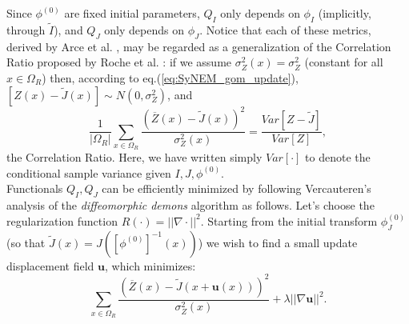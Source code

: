 Since $\phi^{(0)}$ are fixed initial parameters, $Q_{I}$ only depends on $\phi_{I}$ (implicitly, through $\tilde{I}$), and $Q_{J}$ only depends on $\phi_{J}$. Notice that each of
these metrics, derived by Arce et al. \cite{Arce-santana2014}, may be regarded as a generalization of the Correlation Ratio proposed by
Roche et al. \cite{Roche1998}: if we assume $\sigma^{2}_{Z}(x) = \sigma^{2}_{Z}$ (constant for all $x\in\Omega_{R}$) then, according to
eq.(\ref{eq:SyNEM_gom_update}),\hbox{$\left[Z(x) - \tilde{J}(x)\right] \sim N(0, \sigma^{2}_{Z})$}, and
\begin{equation}
    \frac{1}{|\Omega_{R}|}\sum_{x \in \Omega_{R}} \frac{\left(\overline{Z}(x) - \tilde{J}(x)\right)^{2}}{\sigma^{2}_{Z}(x)} =
    \frac{Var\left[Z - \tilde{J}\right]}{Var\left[Z\right]},
\end{equation}
the Correlation Ratio. Here, we have written simply $Var[\cdot]$ to denote the conditional sample variance given $ I, J, \phi^{(0)}$.\\

Functionals $Q_{I}, Q_{J}$ can be efficiently minimized by following Vercauteren's analysis of the \textit{diffeomorphic demons} algorithm \cite{Vercauteren2009} as follows.
Let's choose the regularization function $R(\cdot) = ||\nabla \cdot||^{2}$. Starting from the initial transform $\phi^{(0)}_{J}$ (so that
$\tilde{J}(x) = J(\left[\phi^{(0)}\right]^{-1}(x))$) we wish to find a small update displacement field $\mathbf{u}$, which minimizes:
\begin{equation}\label{eq:vercauteren_cost}
    \sum_{x \in \Omega_{R}} \frac{\left(\overline{Z}(x) - \tilde{J}(x + \mathbf{u}(x))\right)^{2}}{\sigma^{2}_{Z}(x)} + \lambda ||\nabla \mathbf{u}||^{2}.
\end{equation}

